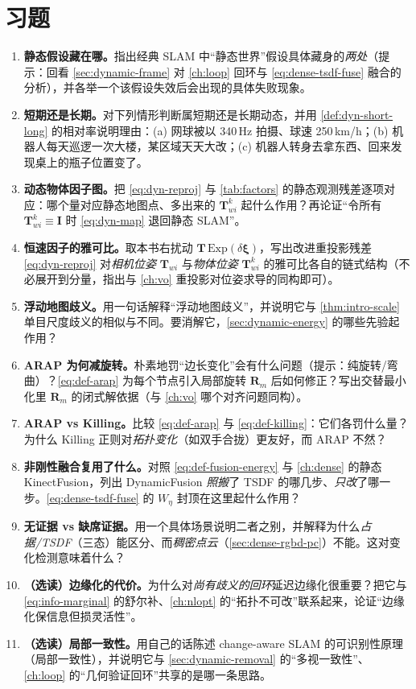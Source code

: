 \section*{习题}
\begin{enumerate}
  \item \textbf{静态假设藏在哪。}\;指出经典 SLAM 中“静态世界”假设具体藏身的\emph{两处}（提示：回看 \cref{sec:dynamic-frame} 对 \cref{ch:loop} 回环与 \cref{eq:dense-tsdf-fuse} 融合的分析），并各举一个该假设失效后会出现的具体失败现象。
  \item \textbf{短期还是长期。}\;对下列情形判断属短期还是长期动态，并用 \cref{def:dyn-short-long} 的相对率说明理由：(a) 网球被以 340\,Hz 拍摄、球速 250\,km/h；(b) 机器人每天巡逻一次大楼，某区域天天大改；(c) 机器人转身去拿东西、回来发现桌上的瓶子位置变了。
  \item \textbf{动态物体因子图。}\;把 \cref{eq:dyn-reproj} 与 \cref{tab:factors} 的静态观测残差逐项对应：哪个量对应静态地图点、多出来的 $\mathbf{T}_{wi}^{k}$ 起什么作用？再论证“令所有 $\mathbf{T}_{wi}^{k}\equiv\mathbf{I}$ 时 \cref{eq:dyn-map} 退回静态 SLAM”。
  \item \textbf{恒速因子的雅可比。}\;取本书右扰动 $\mathbf{T}\,\mathrm{Exp}(\delta\boldsymbol\xi)$，写出改进重投影残差 \cref{eq:dyn-reproj} 对\emph{相机位姿} $\mathbf{T}_{wi}$ 与\emph{物体位姿} $\mathbf{T}_{wi}^{k}$ 的雅可比各自的链式结构（不必展开到分量，指出与 \cref{ch:vo} 重投影对位姿求导的同构即可）。
  \item \textbf{浮动地图歧义。}\;用一句话解释“浮动地图歧义”，并说明它与 \cref{thm:intro-scale} 单目尺度歧义的相似与不同。要消解它，\cref{sec:dynamic-energy} 的哪些先验起作用？
  \item \textbf{ARAP 为何减旋转。}\;朴素地罚“边长变化”会有什么问题（提示：纯旋转/弯曲）？\cref{eq:def-arap} 为每个节点引入局部旋转 $\mathbf{R}_m$ 后如何修正？写出交替最小化里 $\mathbf{R}_m$ 的闭式解依据（与 \cref{ch:vo} 哪个对齐问题同构）。
  \item \textbf{ARAP vs Killing。}\;比较 \cref{eq:def-arap} 与 \cref{eq:def-killing}：它们各罚什么量？为什么 Killing 正则对\emph{拓扑变化}（如双手合拢）更友好，而 ARAP 不然？
  \item \textbf{非刚性融合复用了什么。}\;对照 \cref{eq:def-fusion-energy} 与 \cref{ch:dense} 的静态 KinectFusion，列出 DynamicFusion \emph{照搬}了 TSDF 的哪几步、\emph{只改}了哪一步。\cref{eq:dense-tsdf-fuse} 的 $W_\eta$ 封顶在这里起什么作用？
  \item \textbf{无证据 vs 缺席证据。}\;用一个具体场景说明二者之别，并解释为什么\emph{占据/TSDF}（三态）能区分、而\emph{稠密点云}（\cref{sec:dense-rgbd-pc}）不能。这对变化检测意味着什么？
  \item \textbf{（选读）边缘化的代价。}\;为什么对\emph{尚有歧义的回环}延迟边缘化很重要？把它与 \cref{eq:info-marginal} 的舒尔补、\cref{ch:nlopt} 的“拓扑不可改”联系起来，论证“边缘化保信息但损灵活性”。
  \item \textbf{（选读）局部一致性。}\;用自己的话陈述 change-aware SLAM 的可识别性原理（局部一致性），并说明它与 \cref{sec:dynamic-removal} 的“多视一致性”、\cref{ch:loop} 的“几何验证回环”共享的是哪一条思路。
\end{enumerate}
